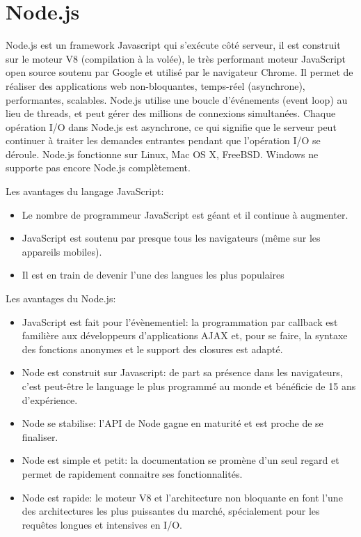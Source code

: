 \documentclass[a4paper,10pt]{report}
\begin{document}
  \section{Node.js}
  
Node.js est un framework Javascript qui s'exécute côté serveur, il est construit sur le moteur V8 (compilation à la volée), le très performant moteur JavaScript open source soutenu par Google et utilisé par le navigateur Chrome. Il permet de réaliser des applications web non-bloquantes, temps-réel (asynchrone), performantes, scalables.
Node.js utilise une boucle d'événements (event loop) au lieu de threads, et peut gérer des millions de connexions simultanées. Chaque opération I/O dans Node.js est asynchrone, ce qui signifie que le serveur peut continuer à traiter les demandes entrantes pendant que l’opération I/O se déroule.
Node.js fonctionne sur Linux, Mac OS X, FreeBSD. Windows ne supporte pas encore Node.js complètement. 

Les avantages du langage JavaScript:
\begin{itemize}
 \item Le nombre de programmeur JavaScript est géant et il continue à augmenter.
 \item JavaScript est soutenu par presque tous les navigateurs (même sur les appareils mobiles).
 \item Il est en train de devenir l'une des langues les plus populaires
\end{itemize}

Les avantages du Node.js:
\begin{itemize}
 \item JavaScript est fait pour l'évènementiel: la programmation par callback est familière aux développeurs d'applications AJAX et, pour se faire, la syntaxe des fonctions anonymes et le support des closures est adapté.
 \item Node est construit sur Javascript: de part sa présence dans les navigateurs, c'est peut-être le language le plus programmé au monde et bénéficie de 15 ans d'expérience.
 \item Node se stabilise: l'API de Node gagne en maturité et est proche de se finaliser.
 \item Node est simple et petit: la documentation se promène d'un seul regard et permet de rapidement connaitre ses fonctionnalités.
 \item Node est rapide: le moteur V8 et l'architecture non bloquante en font l'une des architectures les plus puissantes du marché, spécialement pour les requêtes longues et intensives en I/O.
\end{itemize}
\end{document}
